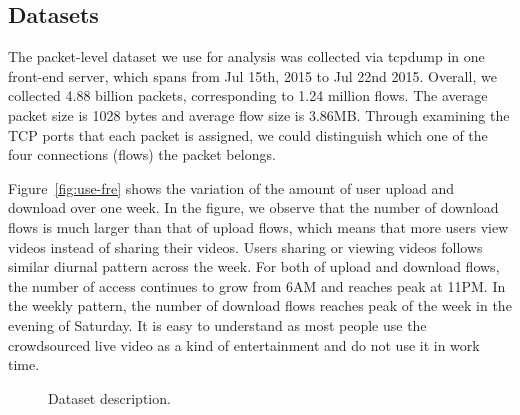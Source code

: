 
\subsection{Datasets}
\label{sec:dataset}



The packet-level dataset we use for analysis was collected via tcpdump in one front-end server, which spans from Jul 15th, 2015 to Jul 22nd 2015. Overall, we collected 4.88 billion packets, corresponding to 1.24 million flows. The average packet size is 1028 bytes and average flow size is 3.86MB. Through examining the TCP ports that each packet is assigned, we could distinguish which one of the four connections (flows) the packet belongs. 

Figure~\ref{fig:use-fre} shows the variation of the amount of user upload and download over one week. In the figure, we observe that the number of download flows is much larger than that of upload flows, which means that more users view videos instead of sharing their videos. Users sharing or viewing videos follows similar diurnal pattern across the week. For both of upload and download flows, the number of access continues to grow from 6AM and reaches peak at 11PM. In the weekly pattern, the number of download flows reaches peak of the week in the evening of Saturday. It is easy to understand as most people use the crowdsourced live video as a kind of entertainment and do not use it in work time.

\begin{figure}[t]
\centering
{}
\hspace{1em}%
	\hspace{1em}%
\caption{Dataset  description.}%
\label{fig:dataset} %
\termspace
\end{figure}

